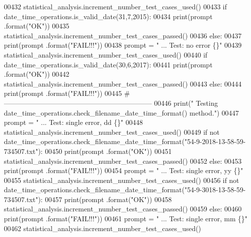 \begin{DoxyCode}
00432         statistical\_analysis.increment\_number\_test\_cases\_used()
00433         \textcolor{keywordflow}{if} date\_time\_operations.is\_valid\_date(31,7,2015):
00434             print(prompt .format(\textcolor{stringliteral}{"OK"}))
00435             statistical\_analysis.increment\_number\_test\_cases\_passed()
00436         \textcolor{keywordflow}{else}:
00437             print(prompt .format(\textcolor{stringliteral}{"FAIL!!!"}))
00438         prompt = \textcolor{stringliteral}{"  ... Test: no error                  \{\}"}
00439         statistical\_analysis.increment\_number\_test\_cases\_used()
00440         \textcolor{keywordflow}{if} date\_time\_operations.is\_valid\_date(30,6,2017):
00441             print(prompt .format(\textcolor{stringliteral}{"OK"}))
00442             statistical\_analysis.increment\_number\_test\_cases\_passed()
00443         \textcolor{keywordflow}{else}:
00444             print(prompt .format(\textcolor{stringliteral}{"FAIL!!!"}))
00445         \textcolor{comment}{# -----------------------------------------------------------------}
00446         print(\textcolor{stringliteral}{" Testing date\_time\_operations.check\_filename\_date\_time\_format() method."})
00447         prompt = \textcolor{stringliteral}{"  ... Test: single error, dd              \{\}"}
00448         statistical\_analysis.increment\_number\_test\_cases\_used()
00449         \textcolor{keywordflow}{if} \textcolor{keywordflow}{not} date\_time\_operations.check\_filename\_date\_time\_format(\textcolor{stringliteral}{"54-9-2018-13-58-59-734507.txt"}):
00450             print(prompt .format(\textcolor{stringliteral}{"OK"}))
00451             statistical\_analysis.increment\_number\_test\_cases\_passed()
00452         \textcolor{keywordflow}{else}:
00453             print(prompt .format(\textcolor{stringliteral}{"FAIL!!!"}))
00454         prompt = \textcolor{stringliteral}{"  ... Test: single error, yy              \{\}"}
00455         statistical\_analysis.increment\_number\_test\_cases\_used()
00456         \textcolor{keywordflow}{if} \textcolor{keywordflow}{not} date\_time\_operations.check\_filename\_date\_time\_format(\textcolor{stringliteral}{"54-9-3018-13-58-59-734507.txt"}):
00457             print(prompt .format(\textcolor{stringliteral}{"OK"}))
00458             statistical\_analysis.increment\_number\_test\_cases\_passed()
00459         \textcolor{keywordflow}{else}:
00460             print(prompt .format(\textcolor{stringliteral}{"FAIL!!!"}))
00461         prompt = \textcolor{stringliteral}{"  ... Test: single error, mm              \{\}"}
00462         statistical\_analysis.increment\_number\_test\_cases\_used()

\end{DoxyCode}
